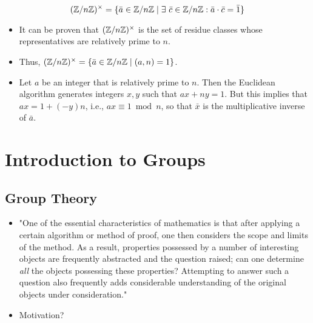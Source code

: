 \documentclass[../notes.tex]{subfiles}
\begin{document}
\begin{itemize}
    \begin{equation*}
        (\mathbb{Z}/n\mathbb{Z})^\times = \{\bar{a}\in\mathbb{Z}/n\mathbb{Z}\mid \exists\ \bar{c}\in\mathbb{Z}/n\mathbb{Z}:\bar{a}\cdot\bar{c}=\bar{1}\}
    \end{equation*}
    \begin{itemize}
        \item It can be proven that $(\mathbb{Z}/n\mathbb{Z})^\times$ is the set of residue classes whose representatives are relatively prime to $n$.
        \item Thus, $(\mathbb{Z}/n\mathbb{Z})^\times=\{\bar{a}\in\mathbb{Z}/n\mathbb{Z}\mid(a,n)=1\}$.
        \item Let $a$ be an integer that is relatively prime to $n$. Then the Euclidean algorithm generates integers $x,y$ such that $ax+ny=1$. But this implies that $ax=1+(-y)n$, i.e., $ax\equiv 1\bmod n$, so that $\bar{x}$ is the multiplicative inverse of $\bar{a}$.
    \end{itemize}
\end{itemize}



\chapter{Introduction to Groups}
\section{Group Theory}
\begin{itemize}
    \item "One of the essential characteristics of mathematics is that after applying a certain algorithm or method of proof, one then considers the scope and limits of the method. As a result, properties possessed by a number of interesting objects are frequently abstracted and the question raised; can one determine \emph{all} the objects possessing these properties? Attempting to answer such a question also frequently adds considerable understanding of the original objects under consideration."
    \item Motivation?
\end{itemize}
\end{document}
